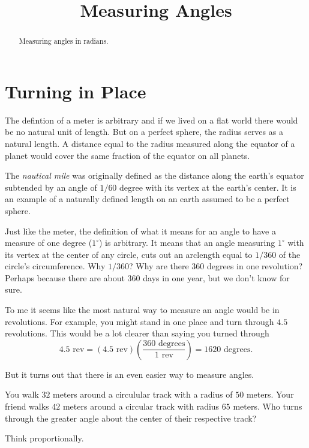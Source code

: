 \documentclass{ximera}
\title{Measuring Angles}
\begin{document}
\begin{abstract}
Measuring angles in radians.
\end{abstract}
\maketitle

\section{Turning in Place}


The defintion of a meter is arbitrary and if we lived on a flat world there would be no natural unit of length. But on a perfect sphere, the radius serves as a natural length. A distance equal to the radius measured along the equator of a planet would cover the same fraction of the equator on all planets.

The \emph{nautical mile} was originally defined as the distance along the earth's equator subtended by an angle of $1/60$ degree with its vertex at the earth's center. It is an example of a naturally defined length on an earth assumed to be a perfect sphere.

Just like the meter, the definition of what it means for an angle to have a measure of one degree ($1^\circ$) is arbitrary. It means that an angle measuring $1^\circ$ with its vertex at the center of any circle, cuts out an arclength equal to $1/360$ of the circle's circumference. Why $1/360$? Why are there 360 degrees in one revolution? Perhaps because there are about 360 days in one year, but we don't know for sure.

To me it seems like the most natural way to measure an angle would be in revolutions. For example, you might stand in one place and turn through $4.5$ revolutions. This would be a lot clearer than saying you turned through
\[
   4.5 \text{ rev} = (4.5 \text{ rev} ) \left( \frac{360 \text{ degrees}}{1 \text{ rev}} \right) = 1620 \text{ degrees}.
\]

But it turns out that there is an even easier way to measure angles. 

\begin{question}   \label{Q00:Radians}
You walk $32$ meters around a circulular track with a radius of $50$ meters. Your friend walks $42$ meters around a circular track with radius $65$ meters. Who turns through the greater angle about the center of their respective track?

\begin{hint}
Think proportionally.
\end{hint}

 
\begin{onlineOnly}
    \begin{center}
\end{center}
\end{onlineOnly}

\end{question}
\end{document}
